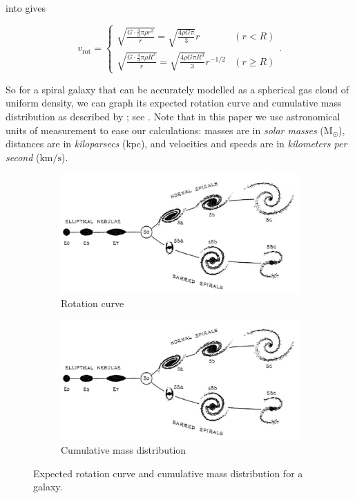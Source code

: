 \documentclass{article}
\newcommand\solmass{\textrm{M}_\odot}
\newcommand\kpc{\textrm{kpc}}
\newcommand\kmps{\textrm{km}/\textrm{s}}
\newcommand\vrot{\ensuremath{v_{\textrm{rot}}}}
\begin{document}
into  gives

\begin{equation}\label{eq:vrotdense}
    \vrot = 
    \begin{cases}
        \sqrt{\frac{G\cdot \frac 4 3 \pi \rho r^3}{r}} = \sqrt{\frac{4\rho G\pi}{3}} r & (r < R) \\
        \sqrt{\frac{G\cdot \frac 4 3 \pi \rho R^3}{r}} = \sqrt{\frac{4\rho G\pi R^3}{3}} r^{-1/2} & (r \ge R)
    \end{cases}.
\end{equation}

So for a spiral galaxy that can be accurately modelled as a spherical gas cloud of uniform density, we can graph its expected rotation curve and cumulative mass distribution as described by ; see .
Note that in this paper we use astronomical units of measurement to ease our calculations: masses are in \textit{solar masses} (\(\solmass\)), distances are in \textit{kiloparsecs} (\(\kpc\)), and velocities and speeds are in \textit{kilometers per second} (\(\kmps\)).

\begin{figure}
    \centering
    \begin{subfigure}{0.4\textwidth}
        \includegraphics[width=\textwidth]{hubblefork}
        \caption{Rotation curve}
    \end{subfigure}
    \hfill
    \begin{subfigure}{0.4\textwidth}
        \includegraphics[width=\textwidth]{hubblefork}
        \caption{Cumulative mass distribution}
    \end{subfigure}
    \caption{Expected rotation curve and cumulative mass distribution for a galaxy.}
    \label{fig:expectedgraphs}
\end{figure}
\end{document}
